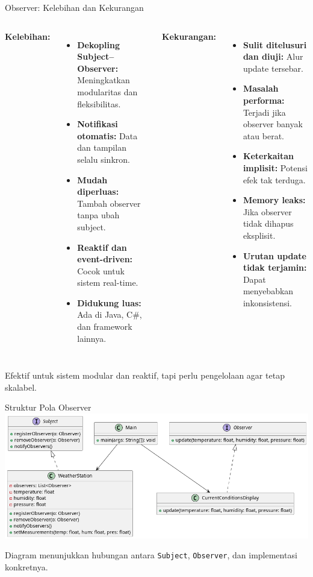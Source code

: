 \documentclass[aspectratio=169, table]{beamer}
\begin{document}
\begin{frame}{Observer: Kelebihan dan Kekurangan}
	\vspace{10pt}
	\begin{columns}[T]
		\textbf{Kelebihan:}
		\begin{itemize}
			\item \textbf{Dekopling Subject–Observer:} Meningkatkan modularitas dan fleksibilitas.
			\item \textbf{Notifikasi otomatis:} Data dan tampilan selalu sinkron.
			\item \textbf{Mudah diperluas:} Tambah observer tanpa ubah subject.
			\item \textbf{Reaktif dan event-driven:} Cocok untuk sistem real-time.
			\item \textbf{Didukung luas:} Ada di Java, C\#, dan framework lainnya.
		\end{itemize}
		
		\textbf{Kekurangan:}
		\begin{itemize}
			\item \textbf{Sulit ditelusuri dan diuji:} Alur update tersebar.
			\item \textbf{Masalah performa:} Terjadi jika observer banyak atau berat.
			\item \textbf{Keterkaitan implisit:} Potensi efek tak terduga.
			\item \textbf{Memory leaks:} Jika observer tidak dihapus eksplisit.
			\item \textbf{Urutan update tidak terjamin:} Dapat menyebabkan inkonsistensi.
		\end{itemize}
	\end{columns}
	
	\vspace{5pt}
	Efektif untuk sistem modular dan reaktif, tapi perlu pengelolaan agar tetap skalabel.
\end{frame}

\begin{frame}{Struktur Pola Observer}
	\vspace{20pt}
	\centering
	\includegraphics[width=.9\textwidth]{../../figures/out/observer.png}
	
	Diagram menunjukkan hubungan antara \texttt{Subject}, \texttt{Observer}, dan implementasi konkretnya.
\end{frame}
\end{document}
